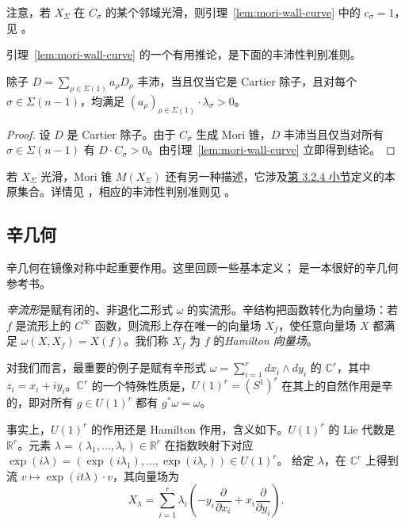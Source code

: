 注意，若 $X_\Sigma$ 在 $C_\sigma$ 的某个邻域光滑，则引理~\ref{lem:mori-wall-curve} 中的 $c_\sigma=1$，见 。

引理~\ref{lem:mori-wall-curve} 的一个有用推论，是下面的丰沛性判别准则。
\begin{corollary}\label{cor:toric-ample-wall}
除子 $D=\sum_{\rho\in\Sigma(1)}a_\rho D_\rho$ 丰沛，当且仅当它是 Cartier 除子，且对每个 $\sigma\in\Sigma(n-1)$，均满足
$(a_\rho)_{\rho\in\Sigma(1)}\cdot\lambda_\sigma>0$。
\end{corollary}
\begin{proof}
设 $D$ 是 Cartier 除子。由于 $C_\sigma$ 生成 Mori 锥，$D$ 丰沛当且仅当对所有 $\sigma\in\Sigma(n-1)$ 有 $D\cdot C_\sigma>0$。由引理~\ref{lem:mori-wall-curve} 立即得到结论。
\end{proof}

若 $X_\Sigma$ 光滑，Mori 锥 $M(X_\Sigma)$ 还有另一种描述，它涉及\hyperref[subsec:toric-from-homogeneous]{第 3.2.4 小节}定义的本原集合。详情见 ，相应的丰沛性判别准则见 。

\subsection{辛几何}\label{subsec:toric-symplectic}

辛几何在镜像对称中起重要作用。这里回顾一些基本定义； 是一本很好的辛几何参考书。

\emph{辛流形}是赋有闭的、非退化二形式 $\omega$ 的实流形。辛结构把函数转化为向量场：若 $f$ 是流形上的 $C^\infty$ 函数，则流形上存在唯一的向量场 $X_f$，使任意向量场 $X$ 都满足 $\omega(X,X_f)=X(f)$。我们称 $X_f$ 为 $f$ 的\emph{Hamilton 向量场}。

对我们而言，最重要的例子是赋有辛形式
$\omega=\sum_{i=1}^{r}dx_i\wedge dy_i$
的 $\mathbb C^r$，其中 $z_i=x_i+iy_i$。$\mathbb C^r$ 的一个特殊性质是，$U(1)^r=(S^1)^r$ 在其上的自然作用是辛的，即对所有 $g\in U(1)^r$ 都有 $g^*\omega=\omega$。

事实上，$U(1)^r$ 的作用还是 Hamilton 作用，含义如下。$U(1)^r$ 的 Lie 代数是 $\mathbb R^r$。元素 $\lambda=(\lambda_1,\ldots,\lambda_r)\in\mathbb R^r$ 在指数映射下对应
$\exp(i\lambda)=(\exp(i\lambda_1),\ldots,\exp(i\lambda_r))\in U(1)^r$。
给定 $\lambda$，在 $\mathbb C^r$ 上得到流
$v\mapsto\exp(it\lambda)\cdot v$，其向量场为
\[
X_\lambda=\sum_{i=1}^{r}\lambda_i
\left(-y_i\frac{\partial}{\partial x_i}
+x_i\frac{\partial}{\partial y_i}\right).
\]

